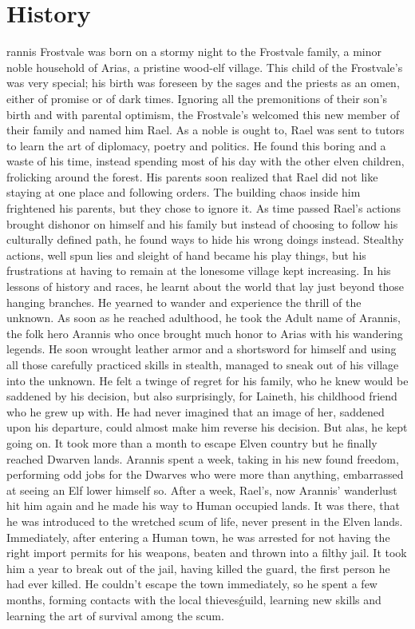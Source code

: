 \documentclass{article}
\begin{document}
\section{History}
rannis Frostvale was born on a stormy night to the Frostvale family, a minor noble household of Arias, a pristine wood-elf village. This child of the Frostvale's was very special; his birth was foreseen by the sages and the priests as an omen, either of promise or of dark times. Ignoring all the premonitions of their son's birth and with parental optimism, the Frostvale's welcomed this new member of their family and named him Rael. 
As a noble is ought to, Rael was sent to tutors to learn the art of diplomacy, poetry and politics. He found this boring and a waste of his time, instead spending most of his day with the other elven children, frolicking around the forest. His parents soon realized that Rael did not like staying at one place and following orders. The building chaos inside him frightened his parents, but they chose to ignore it. As time passed Rael's actions brought dishonor on himself and his family but instead of choosing to follow his culturally defined path, he found ways to hide his wrong doings instead. Stealthy actions, well spun lies and sleight of hand became his play things, but his frustrations at having to remain at the lonesome village kept increasing. In his lessons of history and races, he learnt about the world that lay just beyond those hanging branches. He yearned to wander and experience the thrill of the unknown. As soon as he reached adulthood, he took the Adult name of Arannis, the folk hero Arannis who once brought much honor to Arias with his wandering legends. He soon wrought leather armor and a shortsword for himself and using all those carefully practiced skills in stealth, managed to sneak out of his village into the unknown. He felt a twinge of regret for his family, who he knew would be saddened by his decision, but also surprisingly, for Laineth, his childhood friend who he grew up with. He had never imagined that an image of her, saddened upon his departure, could almost make him reverse his decision. But alas, he kept going on.
It took more than a month to escape Elven country but he finally reached Dwarven lands. Arannis spent a week, taking in his new found freedom, performing odd jobs for the Dwarves who were more than anything, embarrassed at seeing an Elf lower himself so. After a week, Rael's, now Arannis' wanderlust hit him again and he made his way to Human occupied lands. It was there, that he was introduced to the wretched scum of life, never present in the Elven lands. Immediately, after entering a Human town, he was arrested for not having the right import permits for his weapons, beaten and thrown into a filthy jail. It took him a year to break out of the jail, having killed the guard, the first person he had ever killed. He couldn't escape the town immediately, so he spent a few months, forming contacts with the local thieves\' guild, learning new skills and learning the art of survival among the scum.
\end{document}
